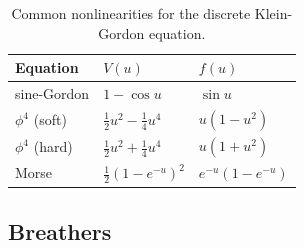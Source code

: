 \documentclass[12pt,reqno]{amsart}
\theoremstyle{definition}
\begin{document}
\begin{table}
\begin{tabular}{lll}\toprule
Equation & $V(u)$ & $f(u)$ \\ \midrule
sine-Gordon & $1 - \cos u$ & $\sin u$ \\
$\phi^4$ (soft) & $\frac{1}{2}u^2 - \frac{1}{4}u^4$ & $u(1-u^2)$ \\
$\phi^4$ (hard) & $\frac{1}{2}u^2 + \frac{1}{4}u^4$ & $u(1+u^2)$ \\
Morse & $\frac{1}{2}(1 - e^{-u})^2$ & $e^{-u}(1 - e^{-u})$ \\ \bottomrule
\end{tabular}
\caption{Common nonlinearities for the discrete Klein-Gordon equation.}
\label{table:V}
\end{table}

\subsection{Breathers}\label{sec:DKGbreather}
\end{document}
